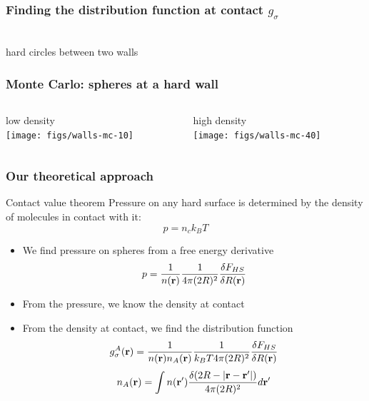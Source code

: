 \begin{frame}
  \frametitle{Finding the distribution function at contact $g_\sigma$}
  \vspace{-0.8em}
  \begin{center}
    \\
    \vspace{-2.0em}
    hard circles between two walls
  \end{center}
\end{frame}

\begin{frame}
  \frametitle{Monte Carlo:  spheres at a hard wall}
  \begin{columns}
    \begin{column}{0.5\columnwidth}
      \begin{center}
        low density\\
        \texttt{[image: figs/walls-mc-10]}
      \end{center}
    \end{column}
    \begin{column}{0.5\columnwidth}
      \begin{center}
        high density\\
        \texttt{[image: figs/walls-mc-40]}
      \end{center}
    \end{column}
  \end{columns}
\end{frame}

\begin{frame}
  \frametitle{Our theoretical approach}
  \begin{block}{Contact value theorem}
    Pressure on any hard surface is determined by the density of
    molecules in contact with it:
    \vspace{-1em}
    \[ p = n_{c}k_BT \]
    \vspace{-2em}
    \begin{itemize}
    \item We find pressure on spheres from a free energy derivative
      \vspace{-0.5em}
      \[p = \frac{1}{n(\mathbf{r})}\frac{1}{4\pi(2R)^2}\frac{\delta F_{HS}}{\delta R(\mathbf{r})}\]
    \item From the pressure, we know the density at contact
    \item From the density at contact, we find the distribution
      function
      \vspace{-0.5em}
      \[g_\sigma^A(\mathbf{r})
      = \frac{1}{n(\mathbf{r}) n_A(\mathbf{r})}\frac{1}{ k_BT 4\pi (2R)^2} \frac{\delta
        F_{HS}}{\delta R(\mathbf{r})}\]
      \[
      n_A(\mathbf{r}) = \int n(\mathbf{r}')
      \frac{\delta(2R -|\mathbf{r}-\mathbf{r}'|)}{4\pi(2R)^2} d\mathbf{r}' \label{eq:nA}
      \]
    \end{itemize}
  \end{block}
\end{frame}

